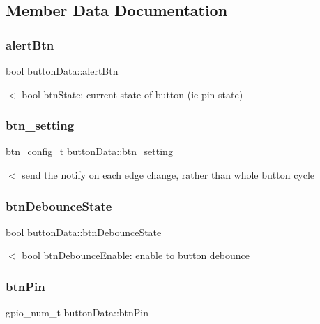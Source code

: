 \subsection{Member Data Documentation}
\mbox{\label{structbuttonData_a4a60f7d8d5649d2470790f43244c8a3f}} 
\subsubsection{\texorpdfstring{alert\+Btn}{alertBtn}}
{\footnotesize\ttfamily bool button\+Data\+::alert\+Btn}

$<$ bool btn\+State\+: current state of button (ie pin state) \mbox{\label{structbuttonData_a77b4789cd0f59ad4238149317efa20c0}} 
\subsubsection{\texorpdfstring{btn\+\_\+setting}{btn\_setting}}
{\footnotesize\ttfamily btn\+\_\+config\+\_\+t button\+Data\+::btn\+\_\+setting}

$<$ send the notify on each edge change, rather than whole button cycle \mbox{\label{structbuttonData_afa9608155098295140e8fbae290c162c}} 
\subsubsection{\texorpdfstring{btn\+Debounce\+State}{btnDebounceState}}
{\footnotesize\ttfamily bool button\+Data\+::btn\+Debounce\+State}

$<$ bool btn\+Debounce\+Enable\+: enable to button debounce \mbox{\label{structbuttonData_a22a4c876c877761e6380b7712e86db3b}} 
\subsubsection{\texorpdfstring{btn\+Pin}{btnPin}}
{\footnotesize\ttfamily gpio\+\_\+num\+\_\+t button\+Data\+::btn\+Pin}

